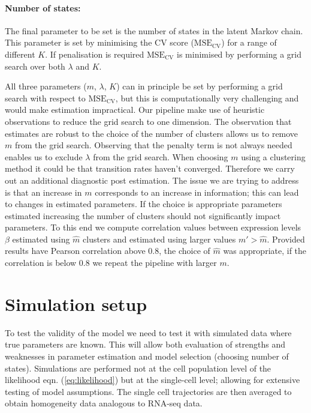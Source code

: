 \paragraph{Number of states:}
\label{sec:number-states}

The final parameter to be set is the number of states in the latent Markov chain. This parameter is set by minimising the CV score ($\mathrm{MSE_{CV}}$) for a range of different $K$. If penalisation is required $\mathrm{MSE_{CV}}$ is minimised by performing a grid search over both $\lambda$ and $K$.

All three parameters ($m$, $\lambda$, $K$) can in principle be set by performing a grid search with respect to $\mathrm{MSE_{CV}}$, but this is computationally very challenging and would make estimation impractical. Our pipeline make use of heuristic observations to reduce the grid search to one dimension. The observation that estimates are robust to the choice of the number of clusters allows us to remove $m$ from the grid search. Observing that the penalty term is not always needed enables us to exclude $\lambda$ from the grid search. When choosing $m$ using a clustering method it could be that transition rates haven't converged. Therefore we carry out an additional diagnostic post estimation. The issue we are trying to address is that an increase in $m$ corresponds to an increase in information; this can lead to changes in estimated parameters. If the choice is appropriate parameters estimated increasing the number of clusters should not significantly impact parameters. To this end we compute correlation values between expression levels $\beta$ estimated using $\hat{m}$ clusters and estimated using larger values $m' > \hat{m}$. Provided results have Pearson correlation above $0.8$, the choice of $\hat{m}$ was appropriate, if the correlation is below $0.8$ we repeat the pipeline with larger $m$. 

\section{Simulation setup}
\label{sec:sim-study}

To test the validity of the model we need to test it with simulated data where true parameters are known. This will allow both evaluation of strengths and weaknesses in parameter estimation and model selection (choosing number of states). Simulations are performed not at the cell population level of the likelihood eqn. (\ref{eq:likelihood}) but at the single-cell level; allowing for extensive testing of model assumptions. The single cell trajectories are then averaged to obtain homogeneity data analogous to RNA-seq data.

